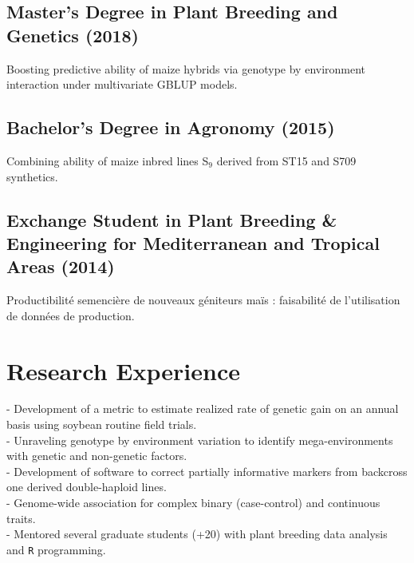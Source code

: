 \documentclass[]{mdkrause_cv_openfont}
\begin{document}
\begin{minipage}[t]{1\textwidth}
\sectionsep
\vspace{0.2 mm}

\subsection{Master's Degree in Plant Breeding and Genetics (2018)}
 Boosting predictive ability of maize hybrids via genotype by environment interaction under multivariate GBLUP models.

\sectionsep
\vspace{0.2 mm}

\subsection{Bachelor's Degree in Agronomy (2015)}
 Combining ability of maize inbred lines S$_9$ derived from ST15 and S709 synthetics.

\sectionsep
\vspace{0.2 mm}

\subsection{Exchange Student in Plant Breeding \& Engineering for Mediterranean and Tropical Areas (2014)}
 Productibilité semencière de nouveaux géniteurs maïs : faisabilité de l’utilisation de données de production.

\sectionsep


\section{Research Experience}


- Development of a metric to estimate realized rate of genetic gain on an annual basis using soybean routine field trials. \\
- Unraveling genotype by environment variation to identify mega-environments with genetic and non-genetic factors. \\
- Development of software to correct partially informative markers from backcross one derived double-haploid lines. \\
- Genome-wide association for complex binary (case-control) and continuous traits. \\
- Mentored several graduate students (+20) with plant breeding data analysis and \texttt{R} programming. 


\end{minipage}
\end{document}
